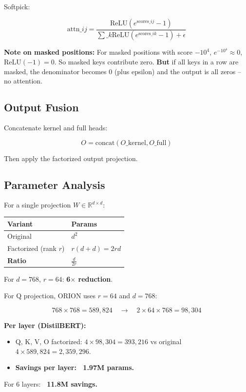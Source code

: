 Softpick:

\[
\text{attn}\_{ij} = \frac{\text{ReLU}(e^{\text{scores}\_{ij}} - 1)}{\sum\_k \text{ReLU}(e^{\text{scores}\_{ik}} - 1) + \epsilon}
\tag{4.9}
\]

\textbf{Note on masked positions:} For masked positions with score $-10^4$, 
$e^{-10^4} \approx 0$, $\text{ReLU}(-1) = 0$. So masked keys contribute 
zero. \textbf{But} if all keys in a row are masked, the denominator becomes 0 
(plus epsilon) and the output is all zeros -- no attention.

\subsection{Output Fusion}

Concatenate kernel and full heads:

\[
O = \text{concat}(O\_{\text{kernel}}, O\_{\text{full}})
\tag{4.10}
\]

Then apply the factorized output projection.

\subsection{Parameter Analysis}

For a single projection $W \in \mathbb{R}^{d \times d}$:

\begin{table}[H]
\centering
\small
\begin{tabular}{ll}
\toprule
\textbf{Variant} & \textbf{Params} \\
\midrule
Original & $d^2$ \\
Factorized (rank $r$) & $r(d + d) = 2rd$ \\
\textbf{Ratio} & $\frac{d}{2r}$ \\
\bottomrule
\end{tabular}
\end{table}

For $d = 768$, $r = 64$: \textbf{6$\times$ reduction}.

For Q projection, ORION uses $r = 64$ and $d = 768$:

\[
768 \times 768 = 589,824 \quad \rightarrow \quad 2 \times 64 \times 768 = 98,304
\]

\textbf{Per layer (DistilBERT):}
\begin{itemize}
\item Q, K, V, O factorized: $4 \times 98,304 = 393,216$ vs original $4 \times 589,824 = 2,359,296$.
\item \textbf{Savings per layer: ~1.97M params.}

\end{itemize}
For 6 layers: \textbf{~11.8M savings.}

